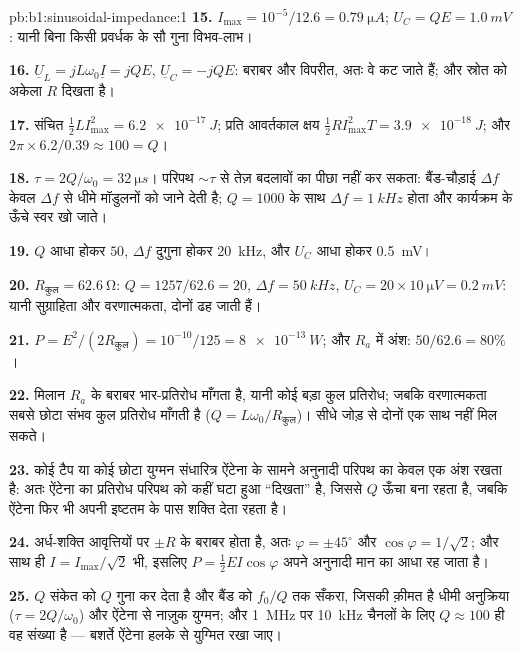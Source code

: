 \begin{solution}{pb:b1:sinusoidal-impedance:1}
\textbf{15.} $I_{\max} = 10^{-5}/12.6 = \qty{0.79}{\micro A}$; $U_C = QE =
\qty{1.0}{mV}$: यानी बिना किसी प्रवर्धक के सौ गुना विभव-लाभ।

\textbf{16.} $\underline U_L = jL\omega_0\underline I = jQE$, $\underline U_C
= -jQE$: बराबर और विपरीत, अतः वे कट जाते हैं; और स्रोत को अकेला $R$ दिखता है।

\textbf{17.} संचित $\tfrac12 LI_{\max}^2 = \qty{6.2e-17}{J}$; प्रति आवर्तकाल
क्षय $\tfrac12 RI_{\max}^2T = \qty{3.9e-18}{J}$; और $2\pi \times 6.2/0.39
\approx 100 = Q$।

\textbf{18.} $\tau = 2Q/\omega_0 = \qty{32}{\micro s}$। परिपथ
$\sim\tau$ से तेज़ बदलावों का पीछा नहीं कर सकता: बैंड-चौड़ाई $\Delta f$
केवल $\Delta f$ से धीमे मॉडुलनों को जाने देती है; $Q = 1000$ के साथ $\Delta f =
\qty{1}{kHz}$ होता और कार्यक्रम के ऊँचे स्वर खो जाते।

\textbf{19.} $Q$ आधा होकर $50$, $\Delta f$ दुगुना होकर \qty{20}{kHz}, और $U_C$
आधा होकर \qty{0.5}{mV}।

\textbf{20.} $R_{\text{कुल}} = \qty{62.6}{\ohm}$: $Q = 1257/62.6 = 20$,
$\Delta f = \qty{50}{kHz}$, $U_C = 20 \times \qty{10}{\micro V} = \qty{0.2}{mV}$:
यानी सुग्राहिता और वरणात्मकता, दोनों ढह जाती हैं।

\textbf{21.} $P = E^2/(2R_{\text{कुल}}) = 10^{-10}/125 = \qty{8e-13}{W}$;
और $R_a$ में अंश: $50/62.6 = 80\%$।

\textbf{22.} मिलान $R_a$ के बराबर भार-प्रतिरोध माँगता है, यानी कोई
बड़ा कुल प्रतिरोध; जबकि वरणात्मकता सबसे छोटा संभव कुल
प्रतिरोध माँगती है ($Q = L\omega_0/R_{\text{कुल}}$)। सीधे जोड़ से दोनों एक
साथ नहीं मिल सकते।

\textbf{23.} कोई टैप या कोई छोटा युग्मन संधारित्र ऐंटेना के सामने
अनुनादी परिपथ का केवल एक अंश रखता है: अतः ऐंटेना का प्रतिरोध
परिपथ को कहीं घटा हुआ ``दिखता'' है, जिससे $Q$ ऊँचा बना रहता है, जबकि
ऐंटेना फिर भी अपनी इष्टतम के पास शक्ति देता रहता है।

\textbf{24.} अर्ध-शक्ति आवृत्तियों पर  $\pm R$ के बराबर होता है,
अतः $\varphi = \pm45^\circ$ और $\cos\varphi = 1/\sqrt2$; और साथ ही $I =
I_{\max}/\sqrt2$ भी, इसलिए $P = \tfrac12 EI\cos\varphi$ अपने अनुनादी मान का
आधा रह जाता है।

\textbf{25.} $Q$ संकेत को $Q$ गुना कर देता है और बैंड को
$f_0/Q$ तक सँकरा, जिसकी क़ीमत है धीमी अनुक्रिया ($\tau = 2Q/\omega_0$) और
ऐंटेना से नाज़ुक युग्मन; और \qty{1}{MHz} पर \qty{10}{kHz} चैनलों के लिए
$Q \approx 100$ ही वह संख्या है --- बशर्ते ऐंटेना हलके से
युग्मित रखा जाए।
\end{solution}
